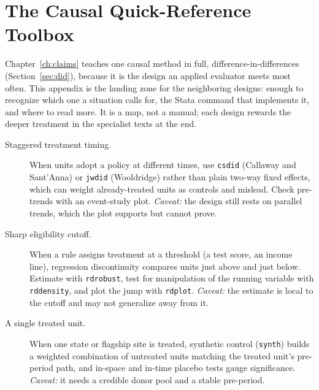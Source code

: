 \documentclass[
    a4paper,
    fontsize=10pt,
    twoside=true,
    numbers=noenddot,
]{kaobook}
\begin{document}
\chapter{The Causal Quick-Reference Toolbox}\label{app:causal}
Chapter~\ref{ch:claims} teaches one causal method in full, difference-in-differences (Section~\ref{sec:did}), because it is the design an applied evaluator meets most often. This appendix is the landing zone for the neighboring designs: enough to recognize which one a situation calls for, the Stata command that implements it, and where to read more. It is a map, not a manual; each design rewards the deeper treatment in the specialist texts at the end.

\begin{description}
    \item[Staggered treatment timing.] When units adopt a policy at different times, use \texttt{csdid} (Callaway and Sant'Anna) or \texttt{jwdid} (Wooldridge) rather than plain two-way fixed effects, which can weight already-treated units as controls and mislead. Check pre-trends with an event-study plot. \emph{Caveat:} the design still rests on parallel trends, which the plot supports but cannot prove.
    \item[Sharp eligibility cutoff.] When a rule assigns treatment at a threshold (a test score, an income line), regression discontinuity compares units just above and just below. Estimate with \texttt{rdrobust}, test for manipulation of the running variable with \texttt{rddensity}, and plot the jump with \texttt{rdplot}. \emph{Caveat:} the estimate is local to the cutoff and may not generalize away from it.
    \item[A single treated unit.] When one state or flagship site is treated, synthetic control (\texttt{synth}) builds a weighted combination of untreated units matching the treated unit's pre-period path, and in-space and in-time placebo tests gauge significance. \emph{Caveat:} it needs a credible donor pool and a stable pre-period.

\end{description}
\end{document}
